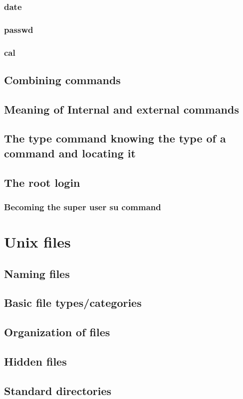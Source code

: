 \documentclass{article}
\begin{document}
	\subsubsection{date}
	\subsubsection{passwd}
	\subsubsection{cal}
	\subsection{Combining commands}
	\subsection{Meaning of Internal and external commands}
	\subsection{The type command knowing the type of a command and locating it}
	\subsection{The root login}
	\subsubsection{Becoming the super user su command}
	
	\section{Unix files}
	\subsection{Naming files}
	\subsection{Basic file types/categories}
	\subsection{Organization of files}
	\subsection{Hidden files}
	\subsection{Standard directories}
\end{document}

